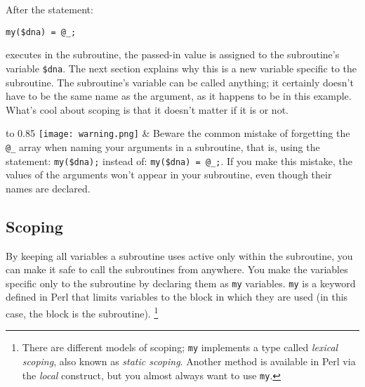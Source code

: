 After the statement:

\begin{lstlisting}
my($dna) = @_;
\end{lstlisting}

executes in the subroutine, the passed-in value is assigned to the subroutine's variable \verb|$dna|. The next section explains why this is a new variable specific to the subroutine. The subroutine's variable can be called anything; it certainly doesn't have to be the same name as the argument, as it happens to be in this example. What's cool about scoping is that it doesn't matter if it is or not. 


\vspace{-5pt}
\begin{table}[h]
  \begin{center}
    \begin{tabu*} to 0.85\linewidth {|X[1,r,m]X[15,l,m]|}
      \tabucline{-}
      \texttt{[image: warning.png]} & Beware the common mistake of forgetting the \verb|@_| array when naming your arguments in a subroutine, that is, using the statement: \verb|my($dna);| instead of: \verb|my($dna) = @_;|. If you make this mistake, the values of the arguments won't appear in your subroutine, even though their names are declared.\\
      \tabucline{-}
    \end{tabu*}
  \end{center}
\end{table}
\vspace{-20pt}

\subsection{Scoping}
By keeping all variables a subroutine uses active only within the subroutine, you can make it safe to call the subroutines from anywhere. You make the variables specific only to the subroutine by declaring them as \verb|my| variables. \verb|my| is a keyword defined in Perl that limits variables to the block in which they are used (in this case, the block is the subroutine). \footnote{There are different models of scoping; \verb|my| implements a type called \textit{lexical scoping}, also known as \textit{static scoping}. Another method is available in Perl via the \textit{local} construct, but you almost always want to use \verb|my|.} 

